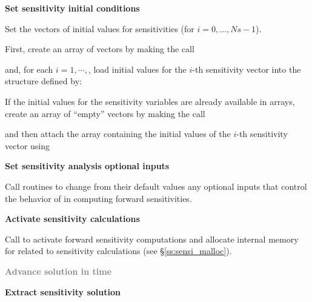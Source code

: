 \begin{Steps}
\item
  {\bf Set sensitivity initial conditions}

  Set the  vectors  of  initial values
  for sensitivities (for $i=0,\ldots,Ns-1$). 

  First, create an array of  vectors by making the call

  {\s} 

  {\p} 

  and, for each $i=1,\cdots,$, load initial values for the $i$-th sensitivity 
  vector into the structure defined by:

  {\s} 

  {\p} 

  If the initial values for the sensitivity variables are already available in
   arrays, create an array of  ``empty'' vectors by making the call

  {\s} 

  {\p} 

  and then attach the  array  containing the initial values of the
  $i$-th sensitivity vector using

  {\s} 
  
  {\p} 
  
\item
  {\bf Set sensitivity analysis optional inputs}

  Call  routines to change from their default values any
  optional inputs that control the behavior of {\cvodes} in computing forward 
  sensitivities.

\item
  {\bf Activate sensitivity calculations}

  Call \id{(\ldots);} to activate forward 
  sensitivity computations and allocate internal memory for {\cvodes} related 
  to sensitivity calculations (see \S\ref{ss:sensi_malloc}).

\item
  \textcolor{gray}{\bf Advance solution in time}

\item
  {\bf Extract sensitivity solution}


\end{Steps}

